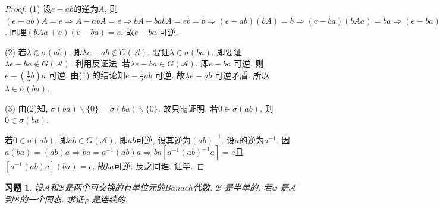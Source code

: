 \documentclass[UTF8,twoside]{ctexbook}
\newtheorem{exercise}{习题}[section]
\newcommand{\h}{\mathscr}
\numberwithin{equation}{section}
\begin{document}
	\begin{proof}
		(1) 设$e-ab$的逆为$A$, 则$(e-ab)A=e \Rightarrow A-abA=e \Rightarrow bA-babA = eb=b \Rightarrow (e-ab)(bA)=b \Rightarrow (e-ba)(bAa)=ba \Rightarrow (e-ba)(bAa)-(e-ba)=e \Rightarrow (e-ba)(bAa-e)=e$. 同理$(bAa+e)(e-ba)=e$. 故$e-ba$ 可逆.

		(2) 若$\lambda\in\sigma(ab)$. 即$\lambda e-ab\notin G(\h A)$. 要证$\lambda\in\sigma(ba)$. 即要证$\lambda e-ba\notin G(\h A)$. 利用反证法. 若$\lambda e-ba\in G(\h A)$. 即$e-ba$ 可逆. 则$e-(\frac{1}{\lambda}b)a$ 可逆. 由(1) 的结论知$e-\frac{1}{\lambda}ab$ 可逆. 故$\lambda e-ab$ 可逆矛盾. 所以$\lambda\in\sigma(ba)$.

		(3) 由(2)知, $\sigma(ba)\backslash\{0\}=\sigma(ba)\backslash\{0\}$. 故只需证明, 若$0\in\sigma(ab)$, 则$0\in\sigma(ba)$.

		若$0\in\sigma(ab)$. 即$ab\in G(\h A)$. 即$ab$可逆, 设其逆为$(ab)^{-1}$. 设$a$的逆为$a^{-1}$. 因$a(ba)=(ab)a \Rightarrow ba=a^{-1}(ab)a \Rightarrow ba[a^{-1}(ab)^{-1}a]=e$且$[a^{-1}(ab)a](ba)=e$. 故$ba$可逆. 反之同理. 证毕.
	\end{proof}
	\begin{exercise}
		设$\h A$和$\h B$是两个可交换的有单位元的$Banach$代数. $\h B$ 是半单的. 若$\varphi$ 是$\h A$ 到$\h B$的一个同态. 求证$\varphi$ 是连续的.
	\end{exercise}
\end{document}
